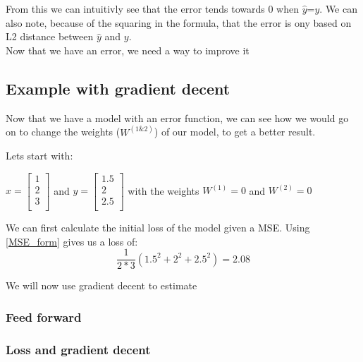 	From this we can intuitivly see that the error tends towards 0 when $\hat{y}$=$y$. We can also note, because of the 
	squaring in the formula, that the error is ony based on L2 distance between $\hat{y}$ and $y$.\\
	
	\vspace{10mm}
	Now that we have an error, we need a way to improve it 
	
	\subsection{Example with gradient decent}
	Now that we have a model with an error function, we can see how we would go on to change the weights ($W^{(1\&2)}$) 
	of our model, to get a better result. 
	
	Lets start with: 
	
	$x=\left[ \begin{array}{c} 1\\ 2\\ 3\\ \end{array} \right]$ 
	and 
	$y=\left[\begin{array}{c} 1.5\\2\\ 2.5\\\end{array}\right]$
	with the weights $W^{(1)}=0$ and $W^{(2)}=0$
	
	We can first calculate the initial loss of the model given a MSE. Using \ref{MSE_form} gives us a loss of:
	\begin{equation}
	   \frac{1}{2*3} (1.5^2+2^2+2.5^2)=2.08
	\end{equation}
	
	
	We will now use gradient decent to estimate
	
	
	
	
	
	\subsubsection{Feed forward}
    
	\subsubsection{Loss and gradient decent }

    
